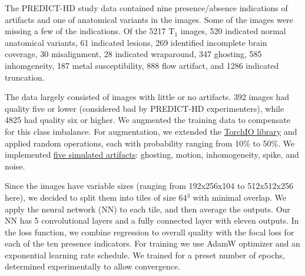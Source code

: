 \documentclass{midl} %
\begin{document}
The PREDICT-HD study data contained nine presence/absence indications of artifacts and one of anatomical variants in the images.
Some of the images were missing a few of the indications.
Of the 5217 T$_1$ images, 520 indicated normal anatomical variants, 61 indicated lesions, 269 identified incomplete brain coverage, 30 misalignment, 28 indicated wraparound, 347 ghosting, 585 inhomgeneity, 187 metal susceptibility, 888 flow artifact, and 1286 indicated truncation.

The data largely consisted of images with little or no artifacts. 392 images had quality five or lower (considered bad by PREDICT-HD experimenters), while 4825 had quality six or higher. We augmented the training data to compensate for this class imbalance. For augmentation, we extended the \href{https://torchio.readthedocs.io/transforms/augmentation.html}{TorchIO library} and applied random operations, each with probability ranging from 10\% to 50\%. We implemented \href{https://github.com/OpenImaging/miqa/pull/339}{five simulated artifacts}: ghosting, motion, inhomogeneity, spike, and noise.

Since the images have variable sizes (ranging from 192x256x104 to 512x512x256 here), we decided to split them into tiles of size 64$^3$ with minimal overlap. We apply the neural network (NN) to each tile, and then average the outputs. Our NN has 5 convolutional layers and a fully connected layer with eleven outputs. In the loss function, we combine regression to overall quality with the focal loss for each of the ten presence indicators. For training we use AdamW optimizer and an exponential learning rate schedule. We trained for a preset number of epochs, determined experimentally to allow convergence.
\end{document}

